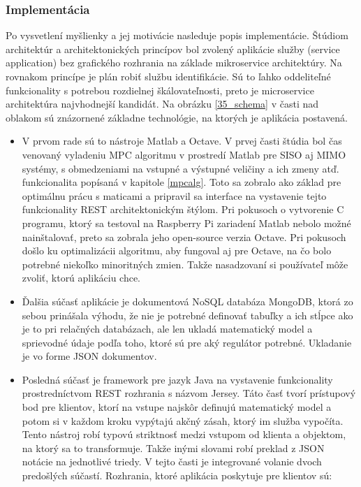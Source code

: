 \subsubsection{Implementácia} \label{seccaas}
Po vysvetlení myšlienky a jej motivácie nasleduje popis implementácie. Štúdiom architektúr a architektonických princípov bol zvolený aplikácie služby (service application) bez grafického rozhrania na základe mikroservice architektúry. Na rovnakom princípe je plán robiť službu identifikácie. Sú to ľahko oddeliteľné funkcionality s potrebou rozdielnej škálovateľnosti, preto je microservice architektúra najvhodnejší kandidát. Na obrázku \ref{35_schema} v časti nad oblakom sú znázornené základne technológie, na ktorých je aplikácia postavená.
\begin{itemize}
  \item V prvom rade sú to nástroje Matlab a Octave. V prvej časti štúdia bol čas venovaný vyladeniu MPC algoritmu v prostredí Matlab pre SISO aj MIMO systémy, s obmedzeniami na vstupné a výstupné veličiny a ich zmeny atď. funkcionalita popísaná v  kapitole \ref{mpcalg}. Toto sa zobralo ako základ pre optimálnu prácu s maticami a pripravil sa interface na vystavenie tejto funkcionality REST architektonickým štýlom. Pri pokusoch o vytvorenie C programu, ktorý sa testoval na Raspberry Pi zariadení Matlab nebolo možné nainštalovať, preto sa zobrala jeho open-source verzia Octave. Pri pokusoch došlo ku optimalizácii algoritmu, aby fungoval aj pre Octave, na čo bolo potrebné niekoľko minoritných zmien. Takže nasadzovaní si používateľ môže zvoliť, ktorú aplikáciu chce.
  \item Ďalšia súčasť aplikácie je dokumentová NoSQL databáza MongoDB, ktorá zo sebou prinášala výhodu, že nie je potrebné definovať tabuľky a ich stĺpce ako je to pri relačných databázach, ale len ukladá matematický model a sprievodné údaje podľa toho, ktoré sú pre aký regulátor potrebné. Ukladanie je vo forme JSON dokumentov.
  \item Posledná súčasť je framework pre jazyk Java na vystavenie funkcionality prostredníctvom REST rozhrania s názvom Jersey. Táto časť tvorí prístupový bod pre klientov, ktorí na vstupe najskôr definujú matematický model a potom si v každom kroku vypýtajú akčný zásah, ktorý im služba vypočíta. Tento nástroj robí typovú striktnosť medzi vstupom od klienta a objektom, na ktorý sa to transformuje. Takže inými slovami robí preklad z JSON notácie na jednotlivé triedy. V tejto časti je integrované volanie dvoch predošlých súčastí. Rozhrania, ktoré aplikácia poskytuje pre klientov sú:

\end{itemize}
